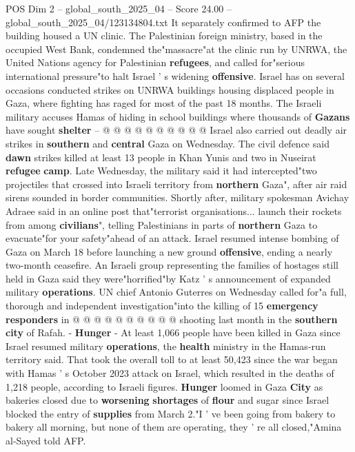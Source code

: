 \begin{textsample}{POS Dim 2 – global\_south\_2025\_04 – Score 24.00 – global\_south\_2025\_04/123134804.txt}
It separately confirmed to AFP the building housed a UN clinic.
The Palestinian foreign ministry, based in the occupied West Bank, condemned the"massacre"at the clinic run by UNRWA, the United Nations agency for Palestinian \textbf{refugees}, and called for"serious international pressure"to halt Israel ' s widening \textbf{offensive}.
Israel has on several occasions conducted strikes on UNRWA buildings housing displaced people in Gaza, where fighting has raged for most of the past 18 months.
The Israeli military accuses Hamas of hiding in school buildings where thousands of \textbf{Gazans} have sought \textbf{shelter} -- @ @ @ @ @ @ @ @ @ @ Israel also carried out deadly air strikes in \textbf{southern} and \textbf{central} Gaza on Wednesday.
The civil defence said \textbf{dawn} strikes killed at least 13 people in Khan Yunis and two in Nuseirat \textbf{refugee} \textbf{camp}.
Late Wednesday, the military said it had intercepted"two projectiles that crossed into Israeli territory from \textbf{northern} Gaza", after air raid sirens sounded in border communities.
Shortly after, military spokesman Avichay Adraee said in an online post that"terrorist organisations... launch their rockets from among \textbf{civilians}", telling Palestinians in parts of \textbf{northern} Gaza to evacuate"for your safety"ahead of an attack.
Israel resumed intense bombing of Gaza on March 18 before launching a new ground \textbf{offensive}, ending a nearly two-month ceasefire.
An Israeli group representing the families of hostages still held in Gaza said they were"horrified"by Katz ' s announcement of expanded military \textbf{operations}.
UN chief Antonio Guterres on Wednesday called for"a full, thorough and independent investigation"into the killing of 15 \textbf{emergency} \textbf{responders} in @ @ @ @ @ @ @ @ @ @ shooting last month in the \textbf{southern} \textbf{city} of Rafah. - \textbf{Hunger} - At least 1,066 people have been killed in Gaza since Israel resumed military \textbf{operations}, the \textbf{health} ministry in the Hamas-run territory said.
That took the overall toll to at least 50,423 since the war began with Hamas ' s October 2023 attack on Israel, which resulted in the deaths of 1,218 people, according to Israeli figures. \textbf{Hunger} loomed in Gaza \textbf{City} as bakeries closed due to \textbf{worsening} \textbf{shortages} of \textbf{flour} and sugar since Israel blocked the entry of \textbf{supplies} from March 2."I ' ve been going from bakery to bakery all morning, but none of them are operating, they ' re all closed,"Amina al-Sayed told AFP.

\end{textsample}
